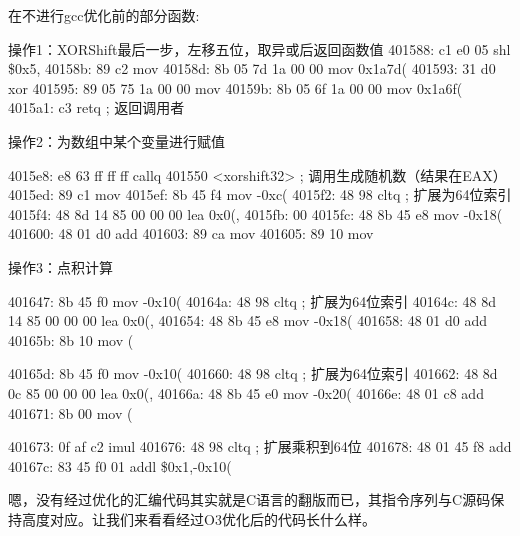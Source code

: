 \documentclass[11pt]{article}
\begin{document}
在不进行gcc优化前的部分函数:
\begin{commandline}
    操作1：XORShift最后一步，左移五位，取异或后返回函数值
401588: c1 e0 05              shl    \$0x5,%
40158b: 89 c2                 mov    %
40158d: 8b 05 7d 1a 00 00     mov    0x1a7d(%
401593: 31 d0                 xor    %
401595: 89 05 75 1a 00 00     mov    %
40159b: 8b 05 6f 1a 00 00     mov    0x1a6f(%
4015a1: c3                    retq                        ; 返回调用者
\end{commandline}
操作2：为数组中某个变量进行赋值
\begin{commandline}
4015e8: e8 63 ff ff ff        callq  401550 <xorshift32> ; 调用生成随机数（结果在EAX）
4015ed: 89 c1                 mov    %
4015ef: 8b 45 f4              mov    -0xc(%
4015f2: 48 98                 cltq                       ; 扩展为64位索引
4015f4: 48 8d 14 85 00 00 00  lea    0x0(,%
4015fb: 00 
4015fc: 48 8b 45 e8           mov    -0x18(%
401600: 48 01 d0              add    %
401603: 89 ca                 mov    %
401605: 89 10                 mov    %
\end{commandline}

操作3：点积计算
\begin{commandline}
401647: 8b 45 f0              mov    -0x10(%
40164a: 48 98                 cltq                       ; 扩展为64位索引
40164c: 48 8d 14 85 00 00 00  lea    0x0(,%
401654: 48 8b 45 e8           mov    -0x18(%
401658: 48 01 d0              add    %
40165b: 8b 10                 mov    (%

40165d: 8b 45 f0              mov    -0x10(%
401660: 48 98                 cltq                       ; 扩展为64位索引
401662: 48 8d 0c 85 00 00 00  lea    0x0(,%
40166a: 48 8b 45 e0           mov    -0x20(%
40166e: 48 01 c8              add    %
401671: 8b 00                 mov    (%

401673: 0f af c2              imul   %
401676: 48 98                 cltq                       ; 扩展乘积到64位
401678: 48 01 45 f8           add    %
40167c: 83 45 f0 01           addl   \$0x1,-0x10(%

\end{commandline}
嗯，没有经过优化的汇编代码其实就是C语言的翻版而已，其指令序列与C源码保持高度对应。让我们来看看经过O3优化后的代码长什么样。
\end{document}
